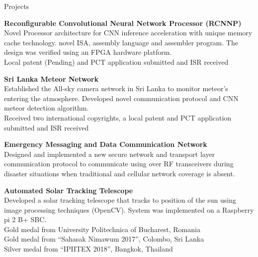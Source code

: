 \documentclass[
	11pt, %
]{./../assets/resume} %
\begin{document}

\begin{rSection}{Projects}

	\textbf{Reconfigurable Convolutional Neural Network Processor (RCNNP)} \\
	Novel Processor architecture for CNN inference acceleration with unique memory cache technology. novel ISA, assembly language and assembler program. The design was verified using an FPGA hardware platform. \\ 
	Local patent (Pending) and PCT application submitted and ISR received 


	\textbf{Sri Lanka Meteor Network} \\
	Established the All-sky camera network in Sri Lanka to monitor meteor's entering the atmosphere.
	Developed novel communication protocol and CNN meteor detection algorithm.\\
	Received two international copyrights, a local patent and PCT application submitted and ISR received 

	\textbf{Emergency Messaging and Data Communication Network} \\
	Designed and implemented a new secure network and transport layer communication protocol to communicate using over RF transceivers during disaster situations when traditional and cellular network coverage is absent.

	\textbf{Automated Solar Tracking Telescope} \\
	Developed a solar tracking telescope that tracks to position of the sun using image processing techniques (OpenCV). System was implemented on a Raspberry pi 2 B+ SBC. \\
	Gold medal from University Politechnica of Bucharest, Romania \\
	Gold medal from “Sahasak Nimawum 2017”, Colombo, Sri Lanka \\
	Silver medal from “IPIITEX 2018”, Bangkok, Thailand

\end{rSection}


\end{document}
